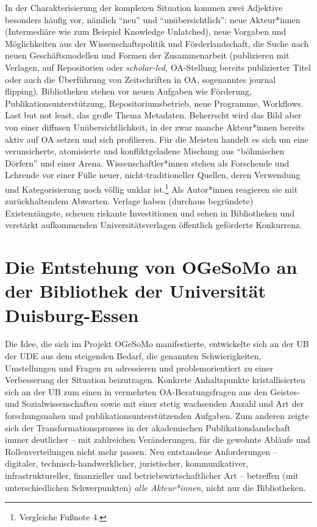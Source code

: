 \documentclass[a4paper,
fontsize=11pt,
oneside,
numbers=noperiodatend,
parskip=half-,
bibliography=totoc,
final
]{scrartcl}
\begin{document}
In der Charakterisierung der komplexen Situation kommen zwei Adjektive
besonders häufig vor, nämlich ``neu'' und ``unübersichtlich'': neue
Akteur*innen (Intermediäre wie zum Beispiel Knowledge Unlatched), neue
Vorgaben und Möglichkeiten aus der Wissenschaftspolitik und
Förderlandschaft, die Suche nach neuen Geschäftsmodellen und Formen der
Zusammenarbeit (publizieren mit Verlagen, auf Repositorien oder
\emph{scholar-led,} OA-Stellung bereits publizierter Titel oder auch die
Überführung von Zeitschriften in OA, sogenanntes journal flipping).
Bibliotheken stehen vor neuen Aufgaben wie Förderung,
Publikationsunterstützung, Repositoriumsbetrieb, neue Programme,
Workflows. Last but not least, das große Thema Metadaten. Beherrscht
wird das Bild aber von einer diffusen Unübersichtlichkeit, in der zwar
manche Akteur*innen bereits aktiv auf OA setzen und sich profilieren.
Für die Meisten handelt es sich um eine verunsicherte, atomisierte und
konfliktgeladene Mischung aus ``böhmischen Dörfern'' und einer Arena.
Wissenschaftler*innen stehen als Forschende und Lehrende vor einer Fülle
neuer, nicht-traditioneller Quellen, deren Verwendung und
Kategorisierung noch völlig unklar ist.\footnote{Vergleiche Fußnote 4.}
Als Autor*innen reagieren sie mit zurückhaltendem Abwarten. Verlage
haben (durchaus begründete) Existenzängste, scheuen riskante
Investitionen und sehen in Bibliotheken und verstärkt aufkommenden
Universitätsverlagen öffentlich geförderte Konkurrenz.

\hypertarget{die-entstehung-von-ogesomo-an-der-bibliothek-der-universituxe4t-duisburg-essen}{%
\section{Die Entstehung von OGeSoMo an der Bibliothek der
Universität
Duisburg-Essen}\label{die-entstehung-von-ogesomo-an-der-bibliothek-der-universituxe4t-duisburg-essen}}

Die Idee, die sich im Projekt OGeSoMo manifestierte, entwickelte sich an
der UB der UDE aus dem steigenden Bedarf, die genannten Schwierigkeiten,
Umstellungen und Fragen zu adressieren und problemorientiert zu einer
Verbesserung der Situation beizutragen. Konkrete Anhaltspunkte
kristallisierten sich an der UB zum einen in vermehrten
OA-Beratungsfragen aus den Geistes- und Sozialwissenschaften sowie mit
einer stetig wachsenden Anzahl und Art der forschungsnahen und
publikationsunterstützenden Aufgaben. Zum anderen zeigte sich der
Transformationsprozess in der akademischen Publikationslandschaft immer
deutlicher -- mit zahlreichen Veränderungen, für die gewohnte Abläufe
und Rollenverteilungen nicht mehr passen. Neu entstandene Anforderungen
-- digitaler, technisch-handwerklicher, juristischer, kommunikativer,
infrastruktureller, finanzieller und betriebswirtschaftlicher Art --
betreffen (mit unterschiedlichen Schwerpunkten) \emph{alle
Akteur*innen}, nicht nur die Bibliotheken.
\end{document}
